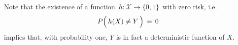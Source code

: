 \begin{remark}
\mbox{}\vskip 0.1cm
\noindent
Note that the existence of a function \,$h : \mathcal{X} \longrightarrow \{0,1\}$\,
with zero risk, i.e.
\begin{equation*}
P\!\left(\,h(X) \overset{{\color{white}.}}{\neq} Y \,\right) \,=\, 0
\end{equation*}
implies that, with probability one, $Y$ is in fact a deterministic function of $X$.
\end{remark}




\renewcommand{\theenumi}{\roman{enumi}}
\renewcommand{\labelenumi}{\textnormal{(\theenumi)}$\;\;$}

